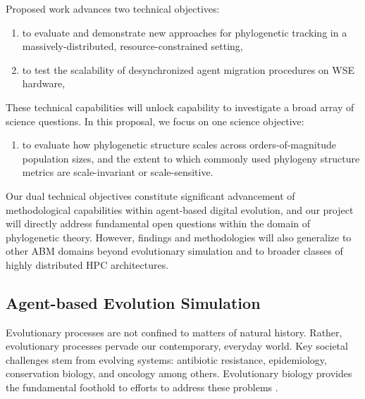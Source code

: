 Proposed work advances two technical objectives:
\begin{enumerate}
\item to evaluate and demonstrate new approaches for phylogenetic tracking in a massively-distributed, resource-constrained setting,
\item to test the scalability of desynchronized agent migration procedures on WSE hardware,
\end{enumerate}

These technical capabilities will unlock capability to investigate a broad array of science questions.
In this proposal, we focus on one science objective:
\begin{enumerate}
\item to evaluate how phylogenetic structure scales across orders-of-magnitude population sizes, and the extent to which commonly used phylogeny structure metrics are scale-invariant or scale-sensitive.
\end{enumerate}

Our dual technical objectives constitute significant advancement of methodological capabilities within agent-based digital evolution, and our project will directly address fundamental open questions within the domain of phylogenetic theory.
However, findings and methodologies will also generalize to other ABM domains beyond evolutionary simulation and to broader classes of highly distributed HPC architectures.

\subsection{Agent-based Evolution Simulation}

Evolutionary processes are not confined to matters of natural history.
Rather, evolutionary processes pervade our contemporary, everyday world.
Key societal challenges stem from evolving systems: antibiotic resistance, epidemiology, conservation biology, and oncology among others.  %
Evolutionary biology provides the fundamental foothold to efforts to address these problems \citep{aktipis2013evolutionary}.

